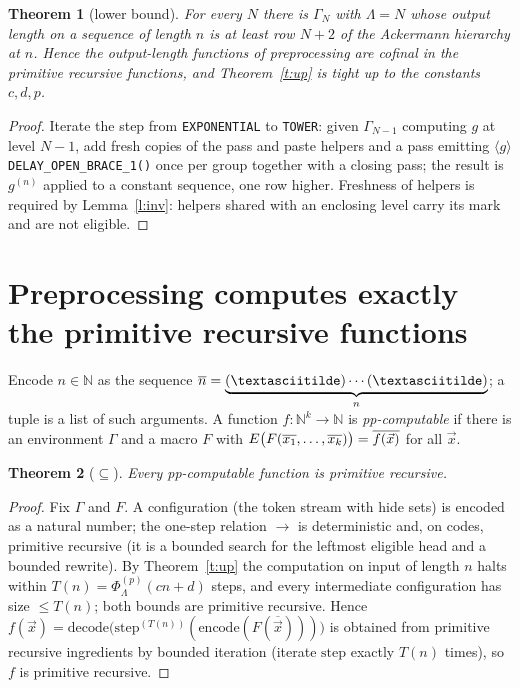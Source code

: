 \documentclass[10pt]{article}
\newtheorem{theorem}{Theorem}
\theoremstyle{definition}
\theoremstyle{remark}
\newcommand{\tok}[1]{\texttt{#1}}
\begin{document}
\begin{theorem}[lower bound]\label{t:low}
For every $N$ there is $\Gamma_N$ with $\Lambda=N$ whose output length on a sequence of length $n$ is at least row
$N+2$ of the Ackermann hierarchy at $n$. Hence the output-length functions of preprocessing are cofinal in the primitive
recursive functions, and Theorem~\ref{t:up} is tight up to the constants $c,d,p$.
\end{theorem}
\begin{proof}
Iterate the step from \tok{EXPONENTIAL} to \tok{TOWER}: given $\Gamma_{N-1}$ computing $g$ at level $N-1$, add fresh
copies of the pass and paste helpers and a pass emitting $\langle g\rangle$\tok{ DELAY\_OPEN\_BRACE\_1()} once per group
together with a closing pass; the result is $g^{(n)}$ applied to a constant sequence, one row higher. Freshness of helpers
is required by Lemma~\ref{l:inv}: helpers shared with an enclosing level carry its mark and are not eligible.
\end{proof}


\section{Preprocessing computes exactly the primitive recursive functions}
Encode $n\in\mathbb N$ as the sequence $\overline n=\underbrace{(\textasciitilde)\cdots(\textasciitilde)}_{n}$; a tuple is a
list of such arguments. A function $f:\mathbb N^k\to\mathbb N$ is \emph{pp-computable} if there is an environment $\Gamma$
and a macro $F$ with $E\big(F(\overline{x_1},\dots,\overline{x_k})\big)=\overline{f(\vec x)}$ for all $\vec x$.

\begin{theorem}[$\subseteq$]\label{t:sub}
Every pp-computable function is primitive recursive.
\end{theorem}
\begin{proof}
Fix $\Gamma$ and $F$. A configuration (the token stream with hide sets) is encoded as a natural number; the one-step
relation $\to$ is deterministic and, on codes, primitive recursive (it is a bounded search for the leftmost eligible head
and a bounded rewrite). By Theorem~\ref{t:up} the computation on input of length $n$ halts within $T(n)=\Phi_\Lambda^{(p)}(cn+d)$
steps, and every intermediate configuration has size $\le T(n)$; both bounds are primitive recursive. Hence
$f(\vec x)=\mathrm{decode}\big(\mathrm{step}^{(T(n))}(\mathrm{encode}(F(\overline{\vec x})))\big)$ is obtained from
primitive recursive ingredients by bounded iteration (iterate $\mathrm{step}$ exactly $T(n)$ times), so $f$ is primitive
recursive.
\end{proof}
\end{document}
